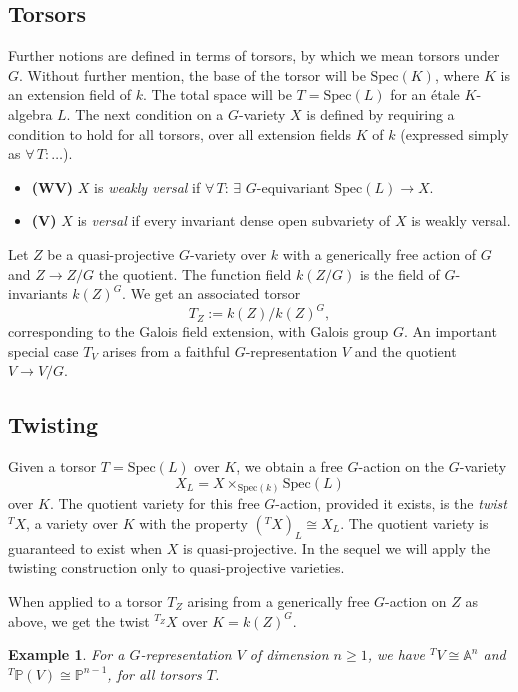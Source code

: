 \documentclass[10pt,a4paper]{amsart}
\numberwithin{equation}{section}
\newtheorem{exam}[prop]{Example}
\def\bA{{\mathbb A}}
\def\bP{{\mathbb P}}
\def\Spec{\mathrm{Spec}}
\begin{document}
\subsection*{Torsors}
Further notions are defined in terms of torsors, by which we mean torsors under $G$.
Without further mention, the base of the torsor will be $\Spec(K)$, where $K$ is an extension field of $k$.
The total space will be $T=\Spec(L)$ for an \'etale $K$-algebra $L$.
The next condition on a $G$-variety $X$ is defined by requiring a condition to hold for all torsors, over all extension fields $K$ of $k$ (expressed simply as $\forall\,T\colon\dots$).
\begin{itemize}
\item \textbf{(WV)} $X$ is \emph{weakly versal} if $\forall\,T$: $\exists$ $G$-equivariant $\Spec(L)\to X$.
\item \textbf{(V)} $X$ is \emph{versal} if every invariant dense open subvariety of $X$ is weakly versal.
\end{itemize}

Let $Z$ be a quasi-projective $G$-variety over $k$ with a generically free action of $G$ and $Z\to Z/G$ the quotient.
The function field $k(Z/G)$ is the field of $G$-invariants $k(Z)^G$.
We get an associated torsor
\[ T_Z:=k(Z)/k(Z)^G, \]
corresponding to the Galois field extension,
with Galois group $G$.
An important special case $T_V$ arises from a faithful $G$-representation $V$ and the quotient $V\to V/G$. 



\subsection*{Twisting}
Given a torsor $T=\Spec(L)$ over $K$, we obtain a free $G$-action on the $G$-variety $$
X_L=X\times_{\Spec(k)}\Spec(L)
$$ 
over $K$.
The quotient variety for this free $G$-action, provided it exists, is the \emph{twist} ${}^TX$,
a variety over $K$ with the property
$({}^TX)_L\cong X_L$.
The quotient variety is guaranteed to exist when $X$ is quasi-projective.
In the sequel we will apply the twisting construction only to quasi-projective varieties.

When applied to a torsor $T_Z$ arising from a generically free 
$G$-action on $Z$ as above, we get the twist ${}^{T_Z}X$ over $K=k(Z)^G$.

\begin{exam}
\label{exa.Vtwist}
For a $G$-representation $V$ of dimension $n\ge 1$, we have
${}^TV\cong \bA^n$ \cite[Lemma 3.1]{DR} and
${}^T\bP(V)\cong \bP^{n-1}$, for all torsors $T$.
\end{exam}
\end{document}
